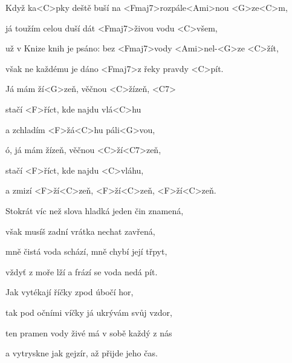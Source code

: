 

\zs
Když ka<C>pky deště buší na <Fmaj7>rozpále<Ami>nou <G>ze<C>m,

já toužím celou duší dát <Fmaj7>živou vodu <C>všem,

už v Knize knih je psáno: bez <Fmaj7>vody <Ami>nel-<G>ze <C>žít,

však ne každému je dáno <Fmaj7>z řeky pravdy <C>pít.
\ks

\zr
Já mám ží<G>zeň, věčnou <C>žízeň, <C7>

stačí <F>říct, kde najdu vlá<C>hu

a zchladím <F>žá<C>hu páli<G>vou,

ó, já mám žízeň, věčnou <C>ží<C7>zeň,

stačí <F>říct, kde najdu <C>vláhu,

a zmizí <F>ží<C>zeň, <F>ží<C>zeň, <F>ží<C>zeň.
\kr

\zs
Stokrát víc než slova hladká jeden čin znamená,

však musíš zadní vrátka nechat zavřená,

mně čistá voda schází, mně chybí její třpyt,

vždyť z moře lží a frází se voda nedá pít.
\ks

\zr \kr

\zs
Jak vytékají říčky zpod úbočí hor,

tak pod očními víčky já ukrývám svůj vzdor,

ten pramen vody živé má v sobě každý z nás

a vytryskne jak gejzír, až přijde jeho čas.
\ks

\zr \kr \zr \kr

\kp
